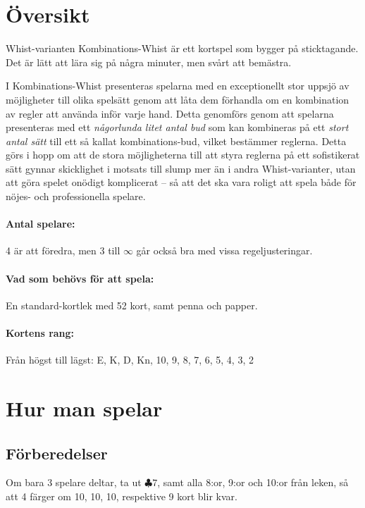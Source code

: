 \documentclass[a4paper]{article} %
\author{Av Joakim Nilsson}
\date{Utvecklingsversion (baserad på version \varVersion-\varLanguage) -- \today}
\date{Version \varVersion-\varLanguage\ -- \today}
\begin{document}

	\introPages
	\pagebreak


	\section{Översikt}
	Whist-varianten Kombinations-Whist är ett kortspel som bygger på sticktagande. Det är lätt att lära sig på några minuter, men svårt att bemästra.

	I Kombinations-Whist presenteras spelarna med en exceptionellt stor uppsjö av möjligheter till olika spelsätt genom att låta dem förhandla om en kombination av regler att använda inför varje hand. Detta genomförs genom att spelarna presenteras med ett \emph{någorlunda litet antal bud} som kan kombineras på ett \emph{stort antal sätt} till ett så kallat kombinations-bud, vilket bestämmer reglerna. Detta görs i hopp om att de stora möjligheterna till att styra reglerna på ett sofistikerat sätt gynnar skicklighet i motsats till slump mer än i andra Whist-varianter, utan att göra spelet onödigt komplicerat -- så att det ska vara roligt att spela både för nöjes- och professionella spelare.

	\paragraph{Antal spelare:}
	4 är att föredra, men 3 till $\infty$ går också bra med vissa regeljusteringar.

	\paragraph{Vad som behövs för att spela:}
	En standard-kortlek med 52 kort, samt penna och papper.

	\paragraph{Kortens rang:}
	Från högst till lägst: E, K, D, Kn, 10, 9, 8, 7, 6, 5, 4, 3, 2

	\section{Hur man spelar}
	\subsection{Förberedelser}
	Om bara 3 spelare deltar, ta ut $\clubsuit 7$, samt alla 8:or, 9:or och 10:or från leken, så att 4 färger om 10, 10, 10, respektive 9 kort blir kvar.
\end{document}
